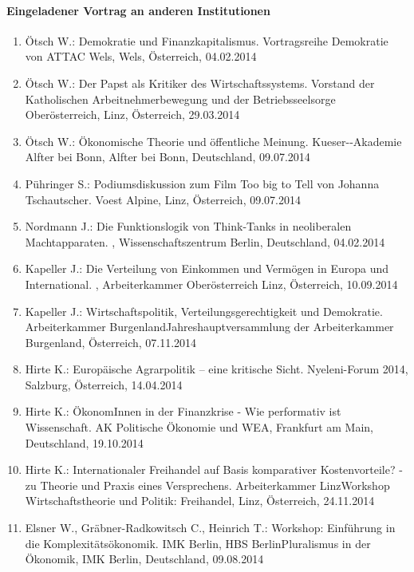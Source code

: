 \paragraph{Eingeladener Vortrag an anderen Institutionen}
\begin{enumerate}
	\item Ötsch W.: Demokratie und Finanzkapitalismus. Vortragsreihe Demokratie von ATTAC Wels, Wels, Österreich, 04.02.2014
	\item Ötsch W.: Der Papst als Kritiker des Wirtschaftssystems. Vorstand der Katholischen Arbeitnehmerbewegung und der Betriebsseelsorge Oberösterreich, Linz, Österreich, 29.03.2014
	\item Ötsch W.: Ökonomische Theorie und öffentliche Meinung. Kueser-­‐Akademie Alfter bei Bonn, Alfter bei Bonn, Deutschland, 09.07.2014
	\item Pühringer S.: Podiumsdiskussion zum Film Too big to Tell von Johanna Tschautscher. Voest Alpine, Linz, Österreich, 09.07.2014
	\item Nordmann J.: Die Funktionslogik von Think-Tanks in neoliberalen Machtapparaten. , Wissenschaftszentrum Berlin, Deutschland, 04.02.2014
	\item Kapeller J.: Die Verteilung von Einkommen und Vermögen in Europa und International. , Arbeiterkammer Oberösterreich Linz, Österreich, 10.09.2014
	\item Kapeller J.: Wirtschaftspolitik, Verteilungsgerechtigkeit und Demokratie. Arbeiterkammer BurgenlandJahreshauptversammlung der Arbeiterkammer Burgenland, Österreich, 07.11.2014
	\item Hirte K.: Europäische Agrarpolitik – eine kritische Sicht. Nyeleni-Forum 2014, Salzburg, Österreich, 14.04.2014
	\item Hirte K.: ÖkonomInnen in der Finanzkrise - Wie performativ ist Wissenschaft. AK Politische Ökonomie und WEA, Frankfurt am Main, Deutschland, 19.10.2014
	\item Hirte K.: Internationaler Freihandel auf Basis komparativer Kostenvorteile? - zu Theorie und Praxis eines Versprechens. Arbeiterkammer LinzWorkshop Wirtschaftstheorie und Politik: Freihandel, Linz, Österreich, 24.11.2014
	\item Elsner W., Gräbner-Radkowitsch C., Heinrich T.: Workshop: Einführung in die Komplexitätsökonomik. IMK Berlin, HBS BerlinPluralismus in der Ökonomik, IMK Berlin, Deutschland, 09.08.2014
\end{enumerate}
